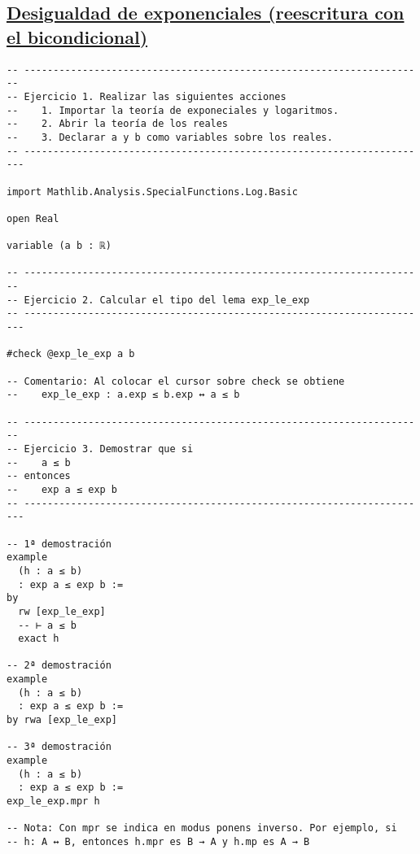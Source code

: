\subsection{\href{./src/Basicos/Desigualdad\_de\_exponenciales.lean}{Desigualdad de exponenciales (reescritura con el bicondicional)}}
\label{sec:orgc9eb616}
\begin{verbatim}
-- ---------------------------------------------------------------------
-- Ejercicio 1. Realizar las siguientes acciones
--    1. Importar la teoría de exponeciales y logaritmos.
--    2. Abrir la teoría de los reales
--    3. Declarar a y b como variables sobre los reales.
-- ----------------------------------------------------------------------

import Mathlib.Analysis.SpecialFunctions.Log.Basic

open Real

variable (a b : ℝ)

-- ---------------------------------------------------------------------
-- Ejercicio 2. Calcular el tipo del lema exp_le_exp
-- ----------------------------------------------------------------------

#check @exp_le_exp a b

-- Comentario: Al colocar el cursor sobre check se obtiene
--    exp_le_exp : a.exp ≤ b.exp ↔ a ≤ b

-- ---------------------------------------------------------------------
-- Ejercicio 3. Demostrar que si
--    a ≤ b
-- entonces
--    exp a ≤ exp b
-- ----------------------------------------------------------------------

-- 1ª demostración
example
  (h : a ≤ b)
  : exp a ≤ exp b :=
by
  rw [exp_le_exp]
  -- ⊢ a ≤ b
  exact h

-- 2ª demostración
example
  (h : a ≤ b)
  : exp a ≤ exp b :=
by rwa [exp_le_exp]

-- 3ª demostración
example
  (h : a ≤ b)
  : exp a ≤ exp b :=
exp_le_exp.mpr h

-- Nota: Con mpr se indica en modus ponens inverso. Por ejemplo, si
-- h: A ↔ B, entonces h.mpr es B → A y h.mp es A → B
\end{verbatim}

